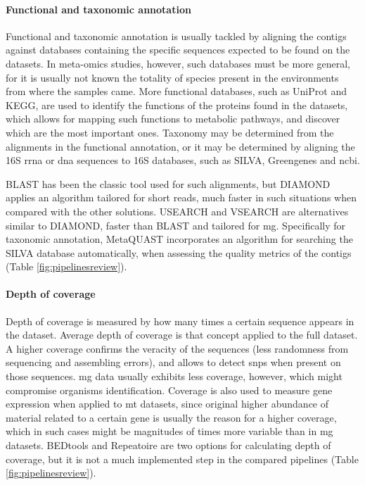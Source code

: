 \documentclass[
  oneside,
  11pt, a4paper,
  footinclude=true,
  headinclude=true,
  cleardoublepage=empty
]{scrbook}
\begin{document}
    \paragraph{Functional and taxonomic annotation}
    
    Functional and taxonomic annotation is usually tackled by aligning the contigs against databases containing the specific sequences expected to be found on the datasets. In meta-omics studies, however, such databases must be more general, for it is usually not known the totality of species present in the environments from where the samples came. More functional databases, such as UniProt and KEGG, are used to identify the functions of the proteins found in the datasets, which allows for mapping such functions to metabolic pathways, and discover which are the most important ones. Taxonomy may be determined from the alignments in the functional annotation, or it may be determined by aligning the 16S \gls{rrna} or \gls{dna} sequences to 16S databases, such as SILVA, Greengenes and \gls{ncbi}.
    
    BLAST has been the classic tool used for such alignments, but DIAMOND applies an algorithm tailored for short reads, much faster in such situations when compared with the other solutions. USEARCH and VSEARCH are alternatives similar to DIAMOND, faster than BLAST and tailored for \gls{mg}. Specifically for taxonomic annotation, MetaQUAST incorporates an algorithm for searching the SILVA database automatically, when assessing the quality metrics of the contigs (Table \ref{fig:pipelinesreview}).
    
    \paragraph{Depth of coverage}
    
    Depth of coverage is measured by how many times a certain sequence appears in the dataset. Average depth of coverage is that concept applied to the full dataset. A higher coverage confirms the veracity of the sequences (less randomness from sequencing and assembling errors), and allows to detect \gls{snp}s when present on those sequences. \gls{mg} data usually exhibits less coverage, however, which might compromise organisms identification. Coverage is also used to measure gene expression when applied to \gls{mt} datasets, since original higher abundance of material related to a certain gene is usually the reason for a higher coverage, which in such cases might be magnitudes of times more variable than in \gls{mg} datasets. BEDtools and Repeatoire are two options for calculating depth of coverage, but it is not a much implemented step in the compared pipelines (Table \ref{fig:pipelinesreview}).
    
\end{document}
